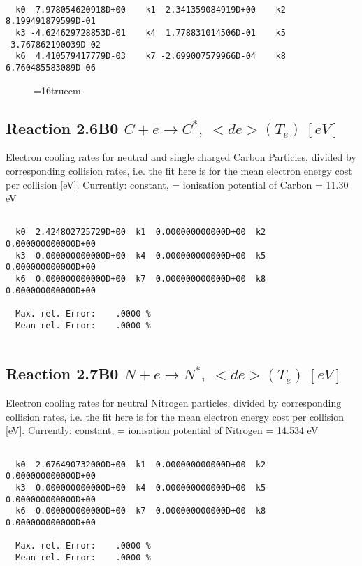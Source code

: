 \documentclass[12pt,dvipdfmx]{article}
\begin{document}
\begin{small}\begin{verbatim}

  k0  7.978054620918D+00    k1 -2.341359084919D+00    k2  8.199491879599D-01
  k3 -4.624629728853D-01    k4  1.778831014506D-01    k5 -3.767862190039D-02
  k6  4.410579417779D-03    k7 -2.699007579966D-04    k8  6.760485583089D-06

\end{verbatim}\end{small}
\begin{figure} \label{2.5ll}
\epsfxsize=16truecm
\end{figure}
\newpage

\subsection{
Reaction 2.6B0   $  C + e  \rightarrow C^*,  \ <de>(T_e) \ [eV] $
}

 Electron cooling rates for neutral and single
 charged Carbon Particles, divided by corresponding collision rates,
i.e. the fit here is for the mean electron energy cost per collision [eV].
 Currently: constant, = ionisation potential of Carbon = 11.30 eV

\begin{small}\begin{verbatim}

  k0  2.424802725729D+00  k1  0.000000000000D+00  k2  0.000000000000D+00
  k3  0.000000000000D+00  k4  0.000000000000D+00  k5  0.000000000000D+00
  k6  0.000000000000D+00  k7  0.000000000000D+00  k8  0.000000000000D+00

  Max. rel. Error:    .0000 %
  Mean rel. Error:    .0000 %


\end{verbatim}\end{small}

\subsection{
Reaction 2.7B0   $  N + e  \rightarrow N^*,  \ <de>(T_e) \ [eV] $
}

 Electron cooling rates for neutral Nitrogen particles, divided by corresponding collision rates, i.e. the fit here is for the mean electron energy cost per collision [eV].
 Currently: constant, = ionisation potential of Nitrogen = 14.534 eV

\begin{small}\begin{verbatim}

  k0  2.676490732000D+00  k1  0.000000000000D+00  k2  0.000000000000D+00
  k3  0.000000000000D+00  k4  0.000000000000D+00  k5  0.000000000000D+00
  k6  0.000000000000D+00  k7  0.000000000000D+00  k8  0.000000000000D+00

  Max. rel. Error:    .0000 %
  Mean rel. Error:    .0000 %


\end{verbatim}\end{small}
\end{document}
